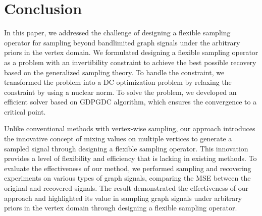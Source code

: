 \documentclass[journal]{IEEEtran}
\begin{document}
\section{Conclusion}
\label{sec:conclusion}
In this paper, we addressed the challenge of designing a flexible sampling operator for sampling beyond bandlimited graph signals under the arbitrary priors in the vertex domain.
We formulated designing a flexible sampling operator as a problem with an invertibility constraint to achieve the best possible recovery based on the generalized sampling theory.
To handle the constraint, we transformed the problem into a DC optimization problem by relaxing the constraint by using a nuclear norm.
To solve the problem, we developed an efficient solver based on GDPGDC algorithm, which ensures the convergence to a critical point.

Unlike conventional methods with vertex-wise sampling, our approach introduces the innovative concept of mixing values on multiple vertices to generate a sampled signal through designing a flexible sampling operator.
This innovation provides a level of flexibility and efficiency that is lacking in existing methods.
To evaluate the effectiveness of our method, we performed sampling and recovering experiments on various types of graph signals, comparing the MSE between the original and recovered signals. 
The result demonstrated the effectiveness of our approach and highlighted its value in sampling graph signals under arbitrary priors in the vertex domain through designing a flexible sampling operator.

\appendices
\end{document}
